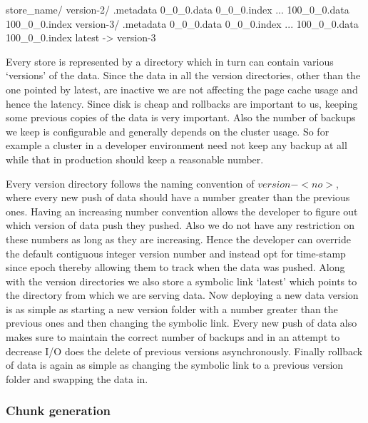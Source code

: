 \documentclass[10pt,twocolumn,preprint,natbib,authoryear]{sigplanconf}
\begin{document}
\scriptsize
\begin{verbatimtab}
store_name/
  version-2/
    .metadata
    0_0_0.data
    0_0_0.index
    ...
    100_0_0.data
    100_0_0.index
  version-3/
    .metadata
    0_0_0.data
    0_0_0.index
    ...
    100_0_0.data
    100_0_0.index
  latest -> version-3
\end{verbatimtab}
\normalsize

Every store is represented by a directory which in turn can contain various `versions' of the data. Since the data in all the version directories, other than the one pointed by latest, are inactive we are not affecting the page cache usage and hence the latency. Since disk is cheap and rollbacks are important to us, keeping some previous copies of the data is very important. Also the number of backups we keep is configurable and generally depends on the cluster usage. So for example a cluster in a developer environment need not keep any backup at all while that in production should keep a reasonable number.

Every version directory follows the naming convention of $version-<no>$, where every new push of data should have a number greater than the previous ones. Having an increasing number convention allows the developer to figure out which version of data push they pushed. Also we do not have any restriction on these numbers as long as they are increasing. Hence the developer can override the default contiguous integer version number and instead opt for time-stamp since epoch thereby allowing them to track when the data was pushed. Along with the version directories we also store a symbolic link `latest' which points to the directory from which we are serving data. Now deploying a new data version is as simple as starting a new version folder with a number greater than the previous ones and then changing the symbolic link. Every new push of data also makes sure to maintain the correct number of backups and in an attempt to decrease I/O does the delete of previous versions asynchronously. Finally rollback of data is again as simple as changing the symbolic link to a previous version folder and swapping the data in. 


\subsubsection{Chunk generation}
\label{sec:read_only:chunk_generation}
\end{document}
